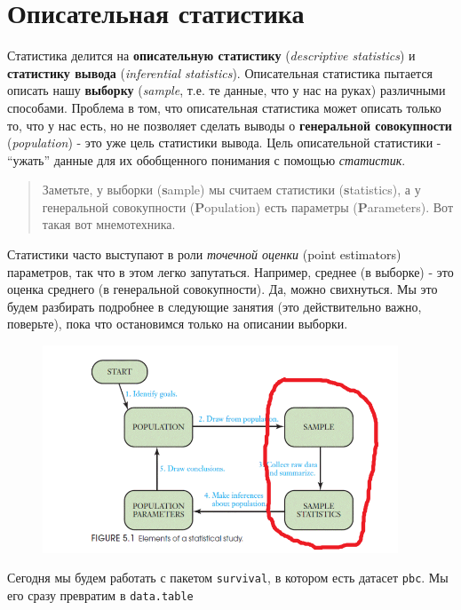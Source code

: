 \documentclass[]{book}
\begin{document}
\section{Описательная статистика}\label{desc}

Статистика делится на \textbf{описательную статистику}
(\emph{descriptive statistics}) и \textbf{статистику вывода}
(\emph{inferential statistics}). Описательная статистика пытается
описать нашу \textbf{выборку} (\emph{sample}, т.е. те данные, что у нас
на руках) различными способами. Проблема в том, что описательная
статистика может описать только то, что у нас есть, но не позволяет
сделать выводы о \textbf{генеральной совокупности} (\emph{population}) -
это уже цель статистики вывода. Цель описательной статистики - ``ужать''
данные для их обобщенного понимания с помощью \emph{статистик}.

\begin{quote}
Заметьте, у выборки (\textbf{s}ample) мы считаем статистики
(\textbf{s}tatistics), а у генеральной совокупности
(\textbf{P}opulation) есть параметры (\textbf{P}arameters). Вот такая
вот мнемотехника.
\end{quote}

Статистики часто выступают в роли \emph{точечной оценки} (point
estimators) параметров, так что в этом легко запутаться. Например,
среднее (в выборке) - это оценка среднего (в генеральной совокупности).
Да, можно свихнуться. Мы это будем разбирать подробнее в следующие
занятия (это действительно важно, поверьте), пока что остановимся только
на описании выборки.

\begin{figure}
\centering
\includegraphics[width=4.16667in]{images/sample2.png}
\caption{}
\end{figure}

Сегодня мы будем работать с пакетом \texttt{survival}, в котором есть
датасет \texttt{pbc}. Мы его сразу превратим в \texttt{data.table}
\end{document}
